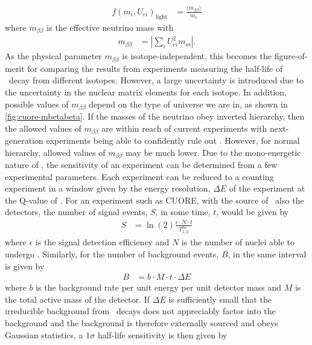 \begin{align}
        f(m_i, U_{ei})_{\textrm{light}} &= \frac{\langle m_{\beta\beta}\rangle}{m_e}
\end{align}
where $m_{\beta\beta}$ is the effective neutrino mass with
\begin{align}
    m_{\beta\beta}&=|\sum_iU^2_{ei}m_{\nu i}|.
    \label{eq:mbetabeta}
\end{align}
As the physical parameter $m_{\beta\beta}$ is isotope-independent, this becomes the figure-of-merit for comparing the results from experiments measuring the half-life of \zeronubb~decay from different isotopes. However, a large uncertainty is introduced due to the uncertainty in the nuclear matrix elements for each isotope.
In addition, possible values of $m_{\beta\beta}$ depend on the type of universe we are in, as shown in \autoref{fig:cuore-mbetabeta}.
If the masses of the neutrino obey inverted hierarchy, then the allowed values of $m_{\beta\beta}$ are within reach of current experiments with next-generation experiments being able to confidently rule out \zeronubb. However, for normal hierarchy, allowed values of $m_{\beta\beta}$ may be much lower. 
Due to the mono-energetic nature of \zeronubb, the sensitivity of an experiment can be determined from a few experimental parameters.
Each experiment can be reduced to a counting experiment in a window given by the energy resolution, $\Delta E$ of the experiment at the Q-value of \zeronubb.
For an experiment such as CUORE, with the source of \zeronubb~also the detectors, the number of signal events, $S$, in some time, $t$, would be given by
\begin{align}
    S &= \ln(2)\frac{\epsilon\cdot N \cdot t}{T^{0\nu}_{1/2}}
    \label{eq:signal_betabeta}
\end{align}
where $\epsilon$ is the signal detection efficiency and $N$ is the number of nuclei able to undergo \zeronubb.
Similarly, for the number of background events, $B$, in the same interval is given by
\begin{align}
    B &= b\cdot M \cdot t \cdot \Delta E
    \label{eq:background_betabeta}
\end{align}
where $b$ is the background rate per unit energy per unit detector mass and $M$ is the total active mass of the detector.
If $\Delta E$ is sufficiently small that the irreducible background from \twonubb~decays does not appreciably factor into the background and the background is therefore externally sourced and obeys Gaussian statistics, a $1\sigma$ half-life sensitivity is then given by
